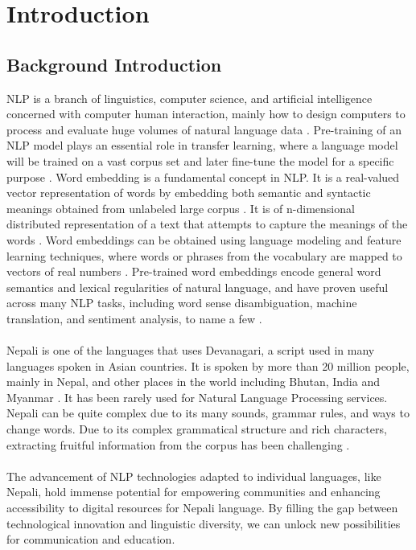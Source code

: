      \chapter{Introduction}
        \section{Background Introduction}
        NLP is a branch of linguistics, computer science, and artificial intelligence concerned with computer human interaction, mainly how to design computers to process and evaluate huge volumes of natural language data \cite{asudani2023impact}. Pre-training of an NLP model plays an essential role in transfer learning, where a language model will be trained on a vast corpus set and later fine-tune the model for a specific purpose \cite{NepaliBERT}. Word embedding is a fundamental concept in NLP. It is a real-valued vector representation of words by embedding both semantic and syntactic meanings obtained from unlabeled large corpus \cite{Wang_Wang_Chen_Wang_Kuo_2019}. It is of n-dimensional distributed representation of a text that attempts to capture the meanings of the words \cite{asudani2023impact}. Word embeddings can be obtained using language modeling and feature learning techniques, where words or phrases from the vocabulary are mapped to vectors of real numbers \cite{enwiki:1219561882}. Pre-trained word embeddings encode general word semantics and lexical regularities of natural language, and have proven useful across many NLP tasks, including word sense disambiguation, machine translation, and sentiment analysis, to name a few \cite{moreo2019wordclass}.\\\\
        Nepali is one of the languages that uses Devanagari, a script used in many languages spoken in Asian countries. It is spoken by more than 20 million people, mainly in Nepal, and other places in the world including Bhutan, India and Myanmar \cite{niraula2020linguistic}.  It has been rarely used for Natural Language Processing services.  Nepali can be quite complex due to its many sounds, grammar rules, and ways to change words. Due to its complex grammatical structure and rich characters, extracting fruitful information from the corpus has been challenging \cite{NepaliBERT}.\\\\
        The advancement of NLP technologies adapted to individual languages, like Nepali, hold immense potential for empowering communities and enhancing accessibility to digital resources for Nepali language. By filling the gap between technological innovation and linguistic diversity, we can unlock new possibilities for communication and education.\\\\
